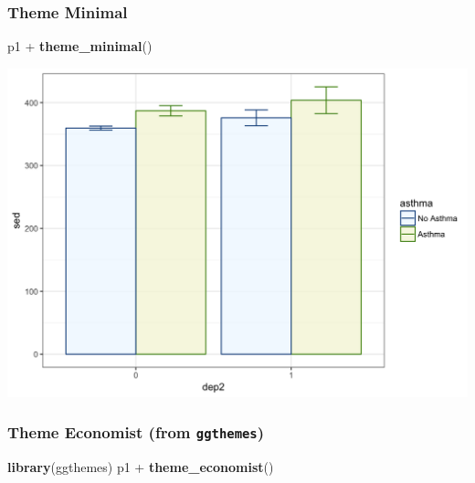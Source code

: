 \documentclass[]{tufte-book}
\newenvironment{Shaded}{}{}
\newcommand{\KeywordTok}[1]{\textcolor[rgb]{0.00,0.44,0.13}{\textbf{#1}}}
\newcommand{\StringTok}[1]{\textcolor[rgb]{0.25,0.44,0.63}{#1}}
\newcommand{\OperatorTok}[1]{\textcolor[rgb]{0.40,0.40,0.40}{#1}}
\newcommand{\NormalTok}[1]{#1}
\theoremstyle{definition}
\theoremstyle{definition}
\theoremstyle{remark}
\begin{document}
\subsubsection*{Theme Minimal}\label{theme-minimal}

\begin{Shaded}
\begin{Highlighting}[]
\NormalTok{p1 }\OperatorTok{+}\StringTok{ }\KeywordTok{theme_minimal}\NormalTok{()}
\end{Highlighting}
\end{Shaded}

\includegraphics{_main_files/figure-latex/unnamed-chunk-147-1}

\subsubsection*{\texorpdfstring{Theme Economist (from
\texttt{ggthemes})}{Theme Economist (from ggthemes)}}\label{theme-economist-from-ggthemes}

\begin{Shaded}
\begin{Highlighting}[]
\KeywordTok{library}\NormalTok{(ggthemes)}
\NormalTok{p1 }\OperatorTok{+}\StringTok{ }\KeywordTok{theme_economist}\NormalTok{()}
\end{Highlighting}
\end{Shaded}
\end{document}
